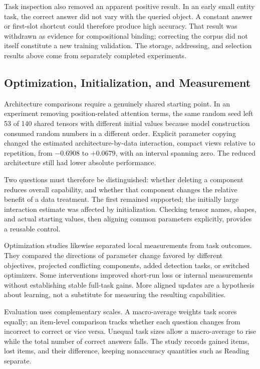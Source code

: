 Task inspection also removed an apparent positive result. In an early small entity task, the correct answer did not vary with the queried object. A constant answer or first-slot shortcut could therefore produce high accuracy. That result was withdrawn as evidence for compositional binding; correcting the corpus did not itself constitute a new training validation. The storage, addressing, and selection results above come from separately completed experiments.

\subsection{Optimization, Initialization, and Measurement}
\label{sec:measurement_branch}

Architecture comparisons require a genuinely shared starting point. In an experiment removing position-related attention terms, the same random seed left 53 of 140 shared tensors with different initial values because model construction consumed random numbers in a different order. Explicit parameter copying changed the estimated architecture-by-data interaction, compact views relative to repetition, from $-0.6908$ to $+0.0679$, with an interval spanning zero. The reduced architecture still had lower absolute performance.

Two questions must therefore be distinguished: whether deleting a component reduces overall capability, and whether that component changes the relative benefit of a data treatment. The first remained supported; the initially large interaction estimate was affected by initialization. Checking tensor names, shapes, and actual starting values, then aligning common parameters explicitly, provides a reusable control.

Optimization studies likewise separated local measurements from task outcomes. They compared the directions of parameter change favored by different objectives, projected conflicting components, added detection tasks, or switched optimizers. Some interventions improved short-run loss or internal measurements without establishing stable full-task gains. More aligned updates are a hypothesis about learning, not a substitute for measuring the resulting capabilities.

Evaluation uses complementary scales. A macro-average weights task scores equally; an item-level comparison tracks whether each question changes from incorrect to correct or vice versa. Unequal task sizes allow a macro-average to rise while the total number of correct answers falls. The study records gained items, lost items, and their difference, keeping nonaccuracy quantities such as Reading separate.

